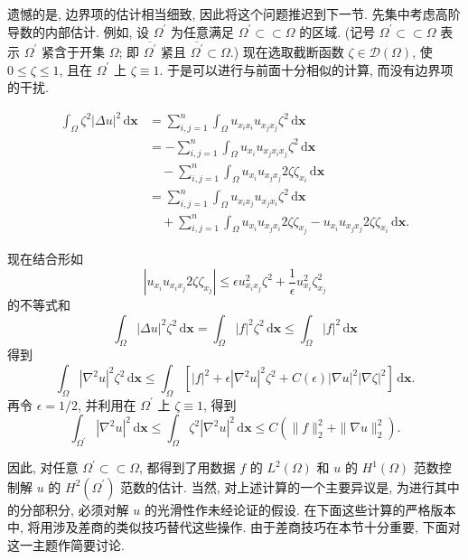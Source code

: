 遗憾的是, 边界项的估计相当细致, 因此将这个问题推迟到下一节. 先集中考虑高阶导数的内部估计. 例如, 设 $\Omega^{\prime}$ 为任意满足 $\Omega^{\prime}\subset\subset\Omega$ 的区域. (记号 $\Omega^{\prime}\subset\subset\Omega$ 表示 $\Omega^{\prime}$ 紧含于开集 $\Omega$; 即 $\overline{\Omega^{\prime}}$ 紧且 $\overline{\Omega^{\prime}}\subset\Omega$.) 现在选取截断函数 $\zeta\in\mathcal{D}(\Omega)$, 使 $0\leq\zeta\leq1$, 且在 $\Omega^{\prime}$ 上 $\zeta\equiv1$. 于是可以进行与前面十分相似的计算, 而没有边界项的干扰.

\[\begin{aligned}
\int_\Omega\zeta^2|\Delta u|^2\,\mathrm{d}\bm{x}
&=\sum_{i,j=1}^n\int_\Omega u_{x_ix_i}u_{x_jx_j}\zeta^2\,\mathrm{d}\bm{x}\\
&=-\sum_{i,j=1}^n\int_\Omega u_{x_i}u_{x_jx_ix_j}\zeta^2\,\mathrm{d}\bm{x}\\
&\quad-\sum_{i,j=1}^n\int_\Omega u_{x_i}u_{x_jx_j}2\zeta\zeta_{x_i}\,\mathrm{d}\bm{x}\\
&=\sum_{i,j=1}^n\int_\Omega u_{x_ix_j}u_{x_jx_i}\zeta^2\,\mathrm{d}\bm{x}\\
&\quad+\sum_{i,j=1}^n\int_\Omega u_{x_i}u_{x_jx_i}2\zeta\zeta_{x_j}-u_{x_i}u_{x_jx_j}2\zeta\zeta_{x_i}\,\mathrm{d}\bm{x}.
\end{aligned}\]

现在结合形如
\begin{equation}\label{eq:interior-cutoff-young-product-bound}
|u_{x_i}u_{x_ix_j}2\zeta\zeta_{x_j}|\leq\epsilon u_{x_ix_j}^2\zeta^2+\frac{1}{\epsilon}u_{x_i}^2\zeta_{x_j}^2
\end{equation}
的不等式和
\begin{equation}\label{eq:interior-cutoff-weighted-data-bound}
\int_\Omega|\Delta u|^2\zeta^2\,\mathrm{d}\bm{x}=\int_\Omega|f|^2\zeta^2\,\mathrm{d}\bm{x}\leq\int_\Omega|f|^2\,\mathrm{d}\bm{x}
\end{equation}
得到
\begin{equation}\label{eq:interior-cutoff-preabsorption-hessian-bound}
\int_\Omega|\nabla^2u|^2\zeta^2\,\mathrm{d}\bm{x}\leq\int_\Omega[|f|^2+\epsilon|\nabla^2u|^2\zeta^2+C(\epsilon)|\nabla u|^2|\nabla\zeta|^2]\,\mathrm{d}\bm{x}.
\end{equation}
再令 $\epsilon=1/2$, 并利用在 $\Omega^{\prime}$ 上 $\zeta\equiv1$, 得到
\begin{equation}\label{eq:interior-cutoff-local-hessian-apriori-estimate}
\int_{\Omega^{\prime}}|\nabla^2u|^2\,\mathrm{d}\bm{x}\leq\int_\Omega\zeta^2|\nabla^2u|^2\,\mathrm{d}\bm{x}\leq C\left(\|f\|_2^2+\|\nabla u\|_2^2\right).
\end{equation}


因此, 对任意 $\Omega^{\prime}\subset\subset\Omega$, 都得到了用数据 $f$ 的 $L^2(\Omega)$ 和 $u$ 的 $H^1(\Omega)$ 范数控制解 $u$ 的 $H^2(\Omega^{\prime})$ 范数的估计. 当然, 对上述计算的一个主要异议是, 为进行其中的分部积分, 必须对解 $u$ 的光滑性作未经论证的假设. 在下面这些计算的严格版本中, 将用涉及差商的类似技巧替代这些操作. 由于差商技巧在本节十分重要, 下面对这一主题作简要讨论.

